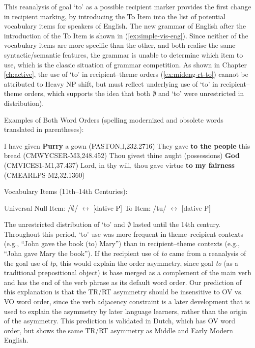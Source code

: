 	This reanalysis of goal `to' as a possible recipient marker provides the first change in recipient marking, by introducing the To Item into the list of potential vocabulary items for speakers of English. The new grammar of English after the introduction of the To Item is shown in (\ref{ex:simple-vis-eng}). Since neither of the vocabulary items are more specific than the other, and both realise the same syntactic/semantic features, the grammar is unable to determine which item to use, which is the classic situation of grammar competition. As shown in Chapter \ref{ch:active}, the use of `to' in recipient--theme orders (\ref{ex:mideng-rt-to}) cannot be attributed to Heavy NP shift, but must reflect underlying use of `to' in recipient--theme orders, which supports the idea that both $\emptyset$ and `to' were unrestricted in distribution). 

	\begin{exe}
		\ex Examples of Both Word Orders (spelling modernized and obsolete words translated in parentheses):
		\begin{xlist}
			\ex I have given \textbf{Purry} a gown (PASTON,I,232.2716)
			\ex They gave \textbf{to the people} this bread (CMWYCSER-M3,248.452)\label{ex:mideng-rt-to}
			\ex Thou givest thine aught (possessions) \textbf{God} (CMVICES1-M1,37.437)
			\ex Lord, in thy will, thou gave virtue \textbf{to my fairness} (CMEARLPS-M2,32.1360)
		\end{xlist}
		\ex Vocabulary Items (11th--14th Centuries):\label{ex:simple-vis-eng}
		\begin{xlist}
			\ex Universal Null Item: /$\emptyset$/ $\leftrightarrow$ [dative P]
			\ex To Item: /tu/ $\leftrightarrow$ [dative P]
		\end{xlist}
	\end{exe}

	The unrestricted distribution of `to' and $\emptyset$ lasted until the 14th century. Throughout this period, `to' use was more frequent in theme--recipient contexts (e.g., ``John gave the book (to) Mary'') than in recipient--theme contexts (e.g., ``John gave Mary the book''). If the recipient use of \textit{to} came from a reanalysis of the goal use of \textit{tp}, this would explain the order asymmetry, since goal \textit{to} (as a traditional prepositional object) is base merged as a complement of the main verb and has the end of the verb phrase as its default word order. Our prediction of this explanation is that the TR/RT asymmetry should be insensitive to OV vs. VO word order, since the verb adjacency constraint is a later development that is used to explain the asymmetry by later language learners, rather than the origin of the asymmetry. This prediction is validated in Dutch, which has OV word order, but shows the same TR/RT asymmetry as Middle and Early Modern English.
	
